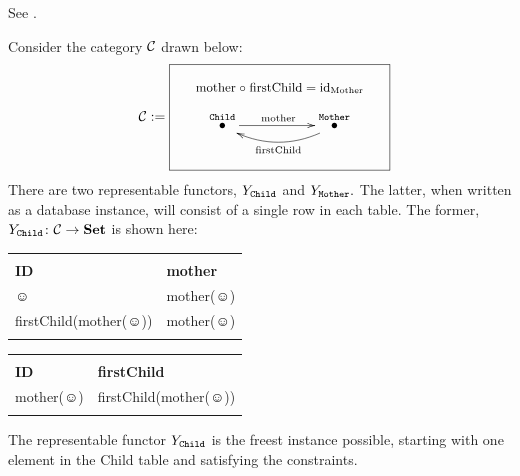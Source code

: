 \documentclass[CT4S-EN-RU]{subfiles}
\begin{document}
\begin{lemmaRUS}\label{lemma:Yoneda}
\end{lemmaRUS}

\begin{proofENG}
See \cite{Mac}.
\end{proofENG}

\begin{proofRUS}
\end{proofRUS}

\begin{exampleENG}\label{ex:yoneda}
Consider the category $\mathcal{C}$ drawn below:
$$
\mcC:=\parbox{2.1in}{\fbox{\parbox{2.1in}{\begin{center}\small mother\;$\circ$\;firstChild\;=\;$\id_{\tn{Mother}}$\normalsize\end{center}$$\xymatrix{\LTO{Child}\ar[rr]^{\tn{mother}}&&\LTO{Mother}\ar@/^1pc/[ll]^{\tn{firstChild}}}$$}}}
$$
There are two representable functors, $Y_{\tt Child}$ and $Y_{\tt Mother}.$ The latter, when written as a database instance, will consist of a single row in each table. The former, $Y_{\tt Child}\colon\mathcal{C}\rightarrow{\mathbf{Set}}$ is shown here:
\begin{center}
\begin{tabular}{| l || l |}\bhline
\multicolumn{2}{|c|}{Child}\\\bhline
{\bf ID}&{\bf mother}\\\hline
$\smiley$&mother($\smiley$)\\\hline
firstChild(mother($\smiley$))&mother($\smiley$)\\\bbhline
\end{tabular}
\hsp
\begin{tabular}{| l || l |}\bhline
\multicolumn{2}{|c|}{Mother}\\\bhline
{\bf ID}&{\bf firstChild}\\\bbhline
mother($\smiley$)&firstChild(mother($\smiley$))\\\bhline
\end{tabular}
\end{center}
The representable functor $Y_{\tt Child}$ is the freest instance possible, starting with one element in the Child table and satisfying the constraints. 


\end{exampleENG}
\end{document}
